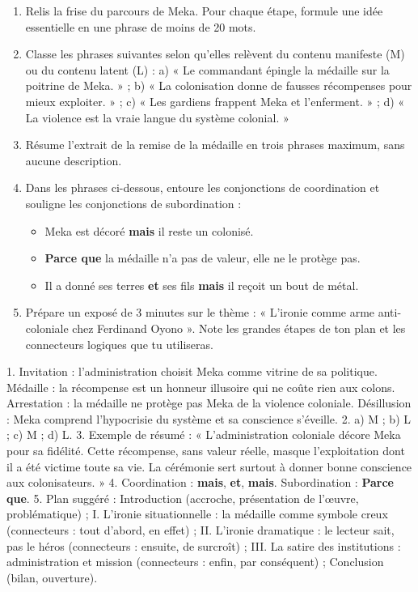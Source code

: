 \documentclass[11pt]{article}
\begin{document}
\begin{exercice}
\begin{enumerate}
\item Relis la frise du parcours de Meka. Pour chaque étape, formule une idée essentielle en une phrase de moins de 20 mots.
\item Classe les phrases suivantes selon qu'elles relèvent du contenu manifeste (M) ou du contenu latent (L) : a) « Le commandant épingle la médaille sur la poitrine de Meka. » ; b) « La colonisation donne de fausses récompenses pour mieux exploiter. » ; c) « Les gardiens frappent Meka et l'enferment. » ; d) « La violence est la vraie langue du système colonial. »
\item Résume l'extrait de la remise de la médaille en trois phrases maximum, sans aucune description.
\item Dans les phrases ci-dessous, entoure les conjonctions de coordination et souligne les conjonctions de subordination : 
\begin{itemize}
\item Meka est décoré \textbf{mais} il reste un colonisé.
\item \textbf{Parce que} la médaille n'a pas de valeur, elle ne le protège pas.
\item Il a donné ses terres \textbf{et} ses fils \textbf{mais} il reçoit un bout de métal.
\end{itemize}
\item Prépare un exposé de 3 minutes sur le thème : « L'ironie comme arme anti-coloniale chez Ferdinand Oyono ». Note les grandes étapes de ton plan et les connecteurs logiques que tu utiliseras.
\end{enumerate}
\end{exercice}

\begin{corrige}[Exercice]
1. Invitation : l'administration choisit Meka comme vitrine de sa politique. Médaille : la récompense est un honneur illusoire qui ne coûte rien aux colons. Arrestation : la médaille ne protège pas Meka de la violence coloniale. Désillusion : Meka comprend l'hypocrisie du système et sa conscience s'éveille.
2. a) M ; b) L ; c) M ; d) L.
3. Exemple de résumé : « L'administration coloniale décore Meka pour sa fidélité. Cette récompense, sans valeur réelle, masque l'exploitation dont il a été victime toute sa vie. La cérémonie sert surtout à donner bonne conscience aux colonisateurs. »
4. Coordination : \textbf{mais}, \textbf{et}, \textbf{mais}. Subordination : \textbf{Parce que}.
5. Plan suggéré : Introduction (accroche, présentation de l'œuvre, problématique) ; I. L'ironie situationnelle : la médaille comme symbole creux (connecteurs : tout d'abord, en effet) ; II. L'ironie dramatique : le lecteur sait, pas le héros (connecteurs : ensuite, de surcroît) ; III. La satire des institutions : administration et mission (connecteurs : enfin, par conséquent) ; Conclusion (bilan, ouverture).
\end{corrige}
\end{document}
